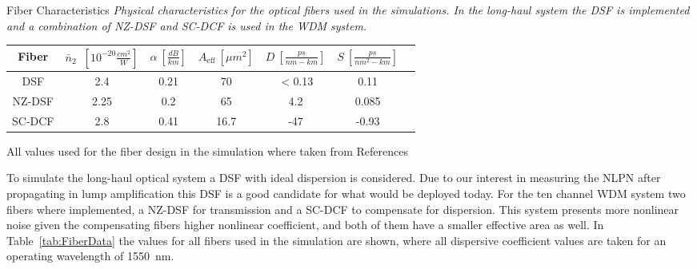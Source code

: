 \begin{mytable}[float=t, label=tab:FiberData]{ Fiber Characteristics}
\emph{Physical characteristics for the optical fibers used in the simulations. In the long-haul system the DSF is implemented and a combination of NZ-DSF and SC-DCF is used in the WDM system. }
\begin{center}
\begin{tabular}{c|cccccc} 
\toprule
Fiber& $\bar{n}_{2}$~$[10^{-20}\frac{cm^2}{W}]$ & $\alpha~[\frac{dB}{km}]$ & $A_{\text{eff}}~[\mu m^2] $  & $D~[\frac{ps}{nm-km}]$ & $S~[\frac{ps}{nm^2-km}]$   \\ 
\midrule
DSF & 2.4 & 0.21 & 70 & $<$0.13 & 0.11  \\ 
\midrule
NZ-DSF & 2.25 & 0.2 & 65 & 4.2 & 0.085  \\ 
\midrule
SC-DCF & 2.8 & 0.41 & 16.7 & -47 & -0.93  \\ 
\bottomrule
\end{tabular} 
\end{center}
All values used for the fiber design in the simulation where taken from References~\cite{kato2000dispersion,kim1994measurement,aikawa2005dispersion,namihira2002comparison} 
\end{mytable}

To simulate the long-haul optical system a DSF with ideal dispersion is considered. Due to our interest in measuring the NLPN after propagating in lump amplification this DSF is a good candidate for what would be deployed today. For the ten channel WDM system two fibers where implemented, a NZ-DSF for transmission and a SC-DCF to compensate for dispersion. This system presents more nonlinear noise given the compensating fibers higher nonlinear coefficient, and both of them have a smaller effective area as well. In  Table~\ref{tab:FiberData} the values for all fibers used in the simulation are shown, where all dispersive coefficient values are taken for an operating wavelength of 1550~nm.
 


